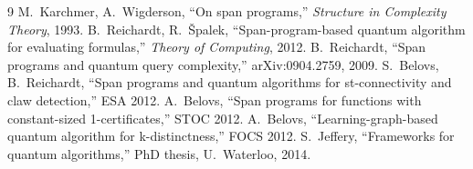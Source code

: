 \documentclass[11pt]{article}
\begin{document}
\begin{thebibliography}{9}
 M.~Karchmer, A.~Wigderson, ``On span programs,'' \emph{Structure in Complexity Theory}, 1993.
 B.~Reichardt, R.~\v{S}palek, ``Span-program-based quantum algorithm for evaluating formulas,'' \emph{Theory of Computing}, 2012.
 B.~Reichardt, ``Span programs and quantum query complexity,'' arXiv:0904.2759, 2009.
 S.~Belovs, B.~Reichardt, ``Span programs and quantum algorithms for st-connectivity and claw detection,'' ESA 2012.
 A.~Belovs, ``Span programs for functions with constant-sized 1-certificates,'' STOC 2012.
 A.~Belovs, ``Learning-graph-based quantum algorithm for k-distinctness,'' FOCS 2012.
 S.~Jeffery, ``Frameworks for quantum algorithms,'' PhD thesis, U.~Waterloo, 2014.
\end{thebibliography}
\end{document}
